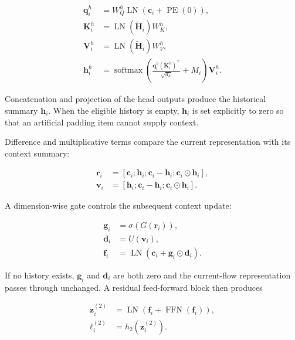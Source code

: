 \documentclass[11pt,fleqn]{report}
\begin{document}
\begin{align}
    \mathbf{q}^{h}_i
    &=W_Q^{h}\operatorname{LN}
      \left(\mathbf{c}_i+\operatorname{PE}(0)\right),\\
    \mathbf{K}^{h}_i
    &=\operatorname{LN}(\widetilde{\mathbf{H}}_i)W_K^{h},\\
    \mathbf{V}^{h}_i
    &=\operatorname{LN}(\widetilde{\mathbf{H}}_i)W_V^{h},\\
    \mathbf{h}^{h}_i
    &=\operatorname{softmax}
      \left(
        \frac{\mathbf{q}^{h}_i(\mathbf{K}^{h}_i)^{\top}}
             {\sqrt{d_h}}+M_i
      \right)
      \mathbf{V}^{h}_i.
    \label{eq:target_query_attention}
\end{align}

Concatenation and projection of the head outputs produce the historical summary $\mathbf{h}_i$. When the eligible history is empty, $\mathbf{h}_i$ is set explicitly to zero so that an artificial padding item cannot supply context.

Difference and multiplicative terms compare the current representation with its context summary:

\begin{align}
    \mathbf{r}_i
    &=[\mathbf{c}_i;\mathbf{h}_i;
       \mathbf{c}_i-\mathbf{h}_i;
       \mathbf{c}_i\odot\mathbf{h}_i],\\
    \mathbf{v}_i
    &=[\mathbf{h}_i;
       \mathbf{c}_i-\mathbf{h}_i;
       \mathbf{c}_i\odot\mathbf{h}_i].
    \label{eq:target_context_interactions}
\end{align}

A dimension-wise gate controls the subsequent context update:

\begin{align}
    \mathbf{g}_i&=\sigma(G(\mathbf{r}_i)),\\
    \mathbf{d}_i&=U(\mathbf{v}_i),\\
    \mathbf{f}_i&=\operatorname{LN}
      \left(\mathbf{c}_i+\mathbf{g}_i\odot\mathbf{d}_i\right).
    \label{eq:gated_context_update}
\end{align}

If no history exists, $\mathbf{g}_i$ and $\mathbf{d}_i$ are both zero and the current-flow representation passes through unchanged. A residual feed-forward block then produces

\begin{align}
    \mathbf{z}^{(2)}_i
    &=\operatorname{LN}
      \left(
        \mathbf{f}_i+\operatorname{FFN}(\mathbf{f}_i)
      \right),\\
    \boldsymbol{\ell}^{(2)}_i
    &=h_2(\mathbf{z}^{(2)}_i).
    \label{eq:stage2_output}
\end{align}
\end{document}
